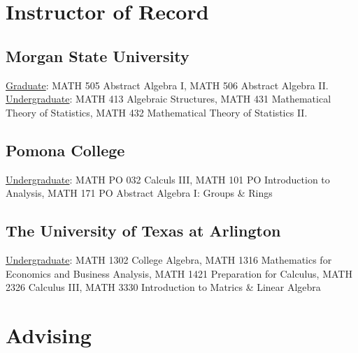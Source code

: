 \documentclass[10pt,a4paper]{article}
\newcommand{\MSU}{Morgan State University}
\newcommand{\UTA}{The University of Texas at Arlington}
\newcommand{\Pomona}{Pomona College}
\begin{document}
\section{Instructor of Record}
\vspace{0.1in}

    \subsection{\MSU}
\href{https://catalog.morgan.edu/preview_program.php?catoid=25\&poid=5681\&hl}{Graduate}: MATH 505 Abstract Algebra I, MATH 506 Abstract Algebra II.\\
\href{https://catalog.morgan.edu/preview_program.php?catoid=24\&poid=5514\&hl}{Undergraduate}: MATH 413 Algebraic Structures, MATH 431 Mathematical Theory of Statistics, MATH 432 Mathematical Theory of Statistics II.

    \subsection{\Pomona}
\href{https://catalog.pomona.edu/content.php?filter%5B27%5D=MATH&filter%5B29%5D=&filter%5Bcourse_type%5D=-1&filter%5Bkeyword%5D=&filter%5B32%5D=1&filter%5Bcpage%5D=1&cur_cat_oid=43&expand=&navoid=8669&search_database=Filter&filter%5Bexact_match%5D=1#acalog_template_course_filter}{Undergraduate}: MATH PO 032 Calculs III, MATH 101 PO Introduction to Analysis, MATH 171 PO Abstract Algebra I: Groups \& Rings

    \subsection{\UTA}
\href{https://catalog.uta.edu/archives/2019-2020/coursedescriptions/math/}{Undergraduate}: MATH 1302 College Algebra, MATH 1316
Mathematics for Economics and Business Analysis, MATH 1421 Preparation for Calculus, MATH 2326 Calculus III, MATH 3330 Introduction to Matrics \& Linear Algebra
\section{Advising}
\vspace{0.1in}
\end{document}
